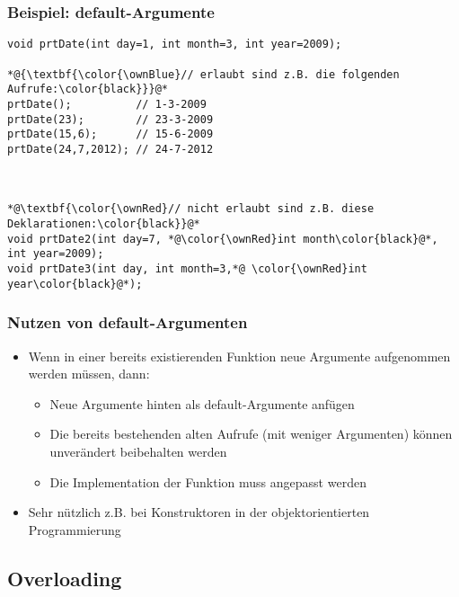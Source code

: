 \subsubsection{Beispiel: default-Argumente\hfill}
\label{sec:unterunterabschnitt}
\noindent
\begin{minipage}{\linewidth}
\begin{lstlisting}
void prtDate(int day=1, int month=3, int year=2009);
	
*@{\textbf{\color{\ownBlue}// erlaubt sind z.B. die folgenden Aufrufe:\color{black}}}@*
prtDate();			// 1-3-2009
prtDate(23);		// 23-3-2009
prtDate(15,6);		// 15-6-2009
prtDate(24,7,2012);	// 24-7-2012

	

*@\textbf{\color{\ownRed}// nicht erlaubt sind z.B. diese Deklarationen:\color{black}}@*
void prtDate2(int day=7, *@\color{\ownRed}int month\color{black}@*, int year=2009);
void prtDate3(int day, int month=3,*@ \color{\ownRed}int year\color{black}@*);
\end{lstlisting}
\end{minipage}

\subsubsection{Nutzen von default-Argumenten\hfill}
\label{sec:unterunterabschnitt}
\begin{itemize}
	\item Wenn in einer bereits existierenden Funktion neue Argumente aufgenommen werden müssen, dann:
	\begin{itemize}
		\item Neue Argumente hinten als default-Argumente anfügen
		\item Die bereits bestehenden alten Aufrufe (mit weniger Argumenten) können unverändert beibehalten werden
		\item Die Implementation der Funktion muss angepasst werden
	\end{itemize}
	\item Sehr nützlich z.B. bei Konstruktoren in der objektorientierten Programmierung
\end{itemize}


\subsection{Overloading\hfill}
\label{sec:unterabschnitt}

